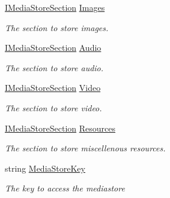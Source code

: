 \begin{DoxyCompactItemize}
\item 
\hyperlink{interface_snowflake_1_1_information_1_1_media_store_1_1_i_media_store_section}{I\+Media\+Store\+Section} \hyperlink{interface_snowflake_1_1_information_1_1_media_store_1_1_i_media_store_a3925774cc1ddc8c2171398ca21638569}{Images}
\begin{DoxyCompactList}\small\item\em The section to store images. \end{DoxyCompactList}\item 
\hyperlink{interface_snowflake_1_1_information_1_1_media_store_1_1_i_media_store_section}{I\+Media\+Store\+Section} \hyperlink{interface_snowflake_1_1_information_1_1_media_store_1_1_i_media_store_a283752cbb2839696fe291e4976b435ed}{Audio}
\begin{DoxyCompactList}\small\item\em The section to store audio. \end{DoxyCompactList}\item 
\hyperlink{interface_snowflake_1_1_information_1_1_media_store_1_1_i_media_store_section}{I\+Media\+Store\+Section} \hyperlink{interface_snowflake_1_1_information_1_1_media_store_1_1_i_media_store_a0d8d5f35916dad519af29f96c5015225}{Video}
\begin{DoxyCompactList}\small\item\em The section to store video. \end{DoxyCompactList}\item 
\hyperlink{interface_snowflake_1_1_information_1_1_media_store_1_1_i_media_store_section}{I\+Media\+Store\+Section} \hyperlink{interface_snowflake_1_1_information_1_1_media_store_1_1_i_media_store_a68360d177681f9ba57362e334f71543d}{Resources}
\begin{DoxyCompactList}\small\item\em The section to store miscellenous resources. \end{DoxyCompactList}\item 
string \hyperlink{interface_snowflake_1_1_information_1_1_media_store_1_1_i_media_store_a025d3397b198dea6450ee0ca1de38d2f}{Media\+Store\+Key}
\begin{DoxyCompactList}\small\item\em The key to access the mediastore \end{DoxyCompactList}\end{DoxyCompactItemize}


